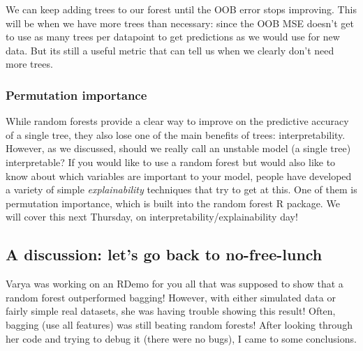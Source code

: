 We can keep adding trees to our forest until the OOB error stops improving. This will be when we have more trees than necessary: since the OOB MSE doesn't get to use as many trees per datapoint to get predictions as we would use for new data. But its still a useful metric that can tell us when we clearly don't need more trees. 

\subsubsection{Permutation importance}

While random forests provide a clear way to improve on the predictive accuracy of a single tree, they also lose one of the main benefits of trees: interpretability. However, as we discussed, should we really call an unstable model (a single tree) interpretable? If you would like to use a random forest but would also like to know about which variables are important to your model, people have developed a variety of simple \emph{explainability} techniques that try to get at this. One of them is permutation importance, which is built into the random forest R package. We will cover this next Thursday, on interpretability/explainability day!


\subsection{A discussion: let's go back to no-free-lunch}

Varya was working on an RDemo for you all that was supposed to show that a random forest outperformed bagging! However, with either simulated data or fairly simple real datasets, she was having trouble showing this result! Often, bagging (use all features) was still beating random forests! After looking through her code and trying to debug it (there were no bugs), I came to some conclusions. 

